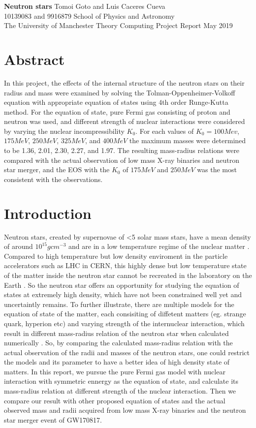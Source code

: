\documentclass[draft,11pt]{article}
\theoremstyle{definition}
\theoremstyle{remark}
\newcommand{\makecover}[5]{
\thispagestyle{empty}
\setcounter{page}{0}
\begin{center}\LARGE{\bf #1}\vskip 24pt \normalsize{#2}\hspace*{\fill}\\
#3\vskip 12pt School of Physics and Astronomy\\The University of Manchester\vskip 12pt Theory Computing Project Report\vskip 12pt #4\end{center}\vskip 54pt

\section*{Abstract}
#5
\newpage}
\begin{document}
    \makecover
    {Neutron stars}
    {Tomoi Goto and Luis Caceres Cueva}
    {10139083 and 9916879}
    {May 2019}
    {In this project, the effects of the internal structure of the neutron stars on their radius and mass were examined by solving the Tolman-Oppenheimer-Volkoff equation with appropriate equation of states using 4th order Runge-Kutta method. For the equation of state, pure Fermi gas consisting of proton and neutron was used, and different strength of nuclear interactions were considered by varying the nuclear incompressibility $K_0$. For each values of $K_0=100Mev$, $175MeV$, $250MeV$, $325MeV$, and $400MeV$ the maximum masses were determined to be \SI{1.36}{\solarmass}, \SI{2.01}{\solarmass}, \SI{2.30}{\solarmass}, \SI{2.27}{\solarmass}, and \SI{1.97}{\solarmass}. The resulting mass-radius relations were compared with the actual observation of low mass X-ray binaries and neutron star merger, and the EOS with the $K_0$ of $175MeV$ and $250MeV$ was the most consistent with the observations.}
    
    \section{Introduction}
        Neutron stars, created by supernovae of <5 solar mass stars, have a mean density of around $10^{15} gcm^{-3}$ and are in a low temperature regime of the nuclear matter \cite{shapiro.teukolsky.1983/bh.wd.ns.co}. Compared to high temperature but low density enviroment in the particle accelerators such as LHC in CERN, this highly dense but low temperature state of the matter inside the neutron star cannot be recreated in the laboratory on the Earth \cite{graber.andersson.2017/ns.lab}. So the neutron star offers an opportunity for studying the equation of states at extremely high density, which have not been constrained well yet and uncertaintly remains.  
        To further illustrate, there are multiple models for the equation of state of the matter, each consisiting of diffetent matters (eg. strange quark, hyperion etc) and varying strength of the internuclear interaction, which result in different mass-radius relation of the neutron star when calculated numerically \cite{graber.andersson.2017/ns.lab}. So, by comparing the calculated mass-radius relation with the actual observation of the radii and masses of the neutron stars, one could restrict the models and its parameter to have a better idea of high density state of matters.
        In this report, we pursue the pure Fermi gas model with nuclear interaction with symmetric ennergy as the equation of state, and calculate its mass-radius relation at different strength of the nuclear interaction. Then we compare our result with other proposed equation of states and the actual observed mass and radii acquired from low mass X-ray binaries and the neutron star merger event of GW170817.
    
\end{document}
